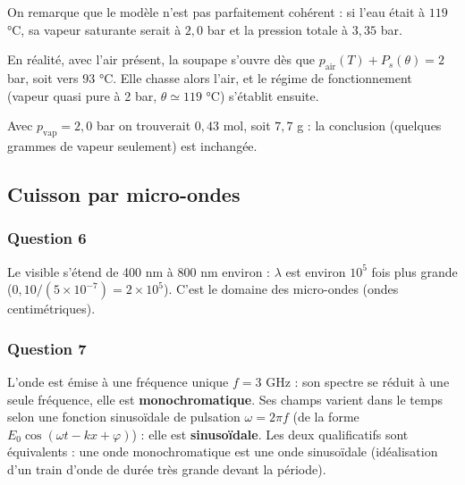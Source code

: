 \documentclass[11pt,a4paper]{article}
\newcommand{\equationajustee}[1]{%
  \sbox{\boiteequation}{$\displaystyle #1$}%
  \ifdim\wd\boiteequation>\linewidth
    \[\resizebox{\linewidth}{!}{\usebox{\boiteequation}}\]%
  \else
    \[#1\]%
  \fi}
\begin{document}
On remarque que le modèle n'est pas parfaitement cohérent : si l'eau était à \(119\) °C, sa vapeur saturante serait à \(2{,}0\) bar et la pression totale à \(3{,}35\) bar.

En réalité, avec l'air présent, la soupape s'ouvre dès que \(p_{\mathrm{air}}(T)+P_s(\theta)=2\) bar, soit vers \(93\) °C. Elle chasse alors l'air, et le régime de fonctionnement (vapeur quasi pure à 2 bar, \(\theta\simeq119\) °C) s'établit ensuite.

Avec \(p_{\mathrm{vap}}=2{,}0\) bar on trouverait \(0{,}43\) mol, soit \(7{,}7\) g : la conclusion (quelques grammes de vapeur seulement) est inchangée.

\hypertarget{cuisson-par-micro-ondes}{%
\subsection{Cuisson par micro-ondes}\label{cuisson-par-micro-ondes}}

\hypertarget{question-6}{%
\subsubsection{Question 6}\label{question-6}}

\equationajustee{\begin{aligned}
\lambda&=\frac cf\\
&=\frac{3{,}00\times10^8}{3\times10^9}\\
&\Longrightarrow\quad\boxed{\lambda=0{,}10\ \mathrm m=10\ \mathrm{cm}}
\end{aligned}}

Le visible s'étend de 400 nm à 800 nm environ : \(\lambda\) est environ \(10^5\) fois plus grande (\(0{,}10/(5\times10^{-7})=2\times10^5\)). C'est le domaine des micro-ondes (ondes centimétriques).

\hypertarget{question-7}{%
\subsubsection{Question 7}\label{question-7}}

L'onde est émise à une fréquence unique \(f=3\) GHz : son spectre se réduit à une seule fréquence, elle est \textbf{monochromatique}. Ses champs varient dans le temps selon une fonction sinusoïdale de pulsation \(\omega=2\pi f\) (de la forme \(E_0\cos(\omega t-kx+\varphi)\)) : elle est \textbf{sinusoïdale}. Les deux qualificatifs sont équivalents : une onde monochromatique est une onde sinusoïdale (idéalisation d'un train d'onde de durée très grande devant la période).
\end{document}
